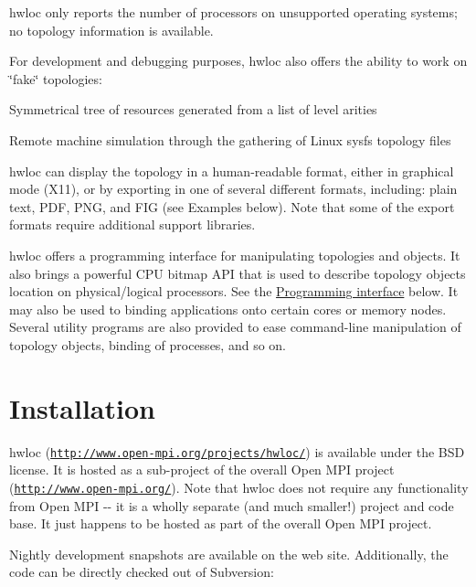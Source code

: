 hwloc only reports the number of processors on unsupported operating systems; no topology information is available.

For development and debugging purposes, hwloc also offers the ability to work on \char`\"{}fake\char`\"{} topologies:


\begin{DoxyItemize}
\item Symmetrical tree of resources generated from a list of level arities 
\item Remote machine simulation through the gathering of Linux sysfs topology files 
\end{DoxyItemize}

hwloc can display the topology in a human-\/readable format, either in graphical mode (X11), or by exporting in one of several different formats, including: plain text, PDF, PNG, and FIG (see Examples below). Note that some of the export formats require additional support libraries.

hwloc offers a programming interface for manipulating topologies and objects. It also brings a powerful CPU bitmap API that is used to describe topology objects location on physical/logical processors. See the \hyperlink{index_interface}{Programming interface} below. It may also be used to binding applications onto certain cores or memory nodes. Several utility programs are also provided to ease command-\/line manipulation of topology objects, binding of processes, and so on.

 \hypertarget{index_installation}{}\section{Installation}\label{index_installation}
hwloc (\href{http://www.open-mpi.org/projects/hwloc/}{\tt http://www.open-\/mpi.org/projects/hwloc/}) is available under the BSD license. It is hosted as a sub-\/project of the overall Open MPI project (\href{http://www.open-mpi.org/}{\tt http://www.open-\/mpi.org/}). Note that hwloc does not require any functionality from Open MPI -\/-\/ it is a wholly separate (and much smaller!) project and code base. It just happens to be hosted as part of the overall Open MPI project.

Nightly development snapshots are available on the web site. Additionally, the code can be directly checked out of Subversion:




